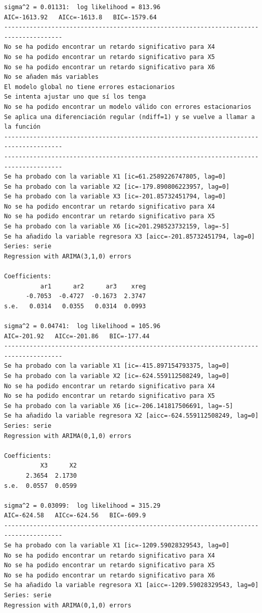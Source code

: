 \documentclass[
  12pt,
  a4paper]{article}
\begin{document}
\begin{verbatim}
sigma^2 = 0.01131:  log likelihood = 813.96
AIC=-1613.92   AICc=-1613.8   BIC=-1579.64
--------------------------------------------------------------------------------------
No se ha podido encontrar un retardo significativo para X4
No se ha podido encontrar un retardo significativo para X5
No se ha podido encontrar un retardo significativo para X6
No se añaden más variables
El modelo global no tiene errores estacionarios
Se intenta ajustar uno que sí los tenga
No se ha podido encontrar un modelo válido con errores estacionarios
Se aplica una diferenciación regular (ndiff=1) y se vuelve a llamar a la función
--------------------------------------------------------------------------------------
--------------------------------------------------------------------------------------
Se ha probado con la variable X1 [ic=61.2589226747805, lag=0]
Se ha probado con la variable X2 [ic=-179.890806223957, lag=0]
Se ha probado con la variable X3 [ic=-201.85732451794, lag=0]
No se ha podido encontrar un retardo significativo para X4
No se ha podido encontrar un retardo significativo para X5
Se ha probado con la variable X6 [ic=201.298523732159, lag=-5]
Se ha añadido la variable regresora X3 [aicc=-201.85732451794, lag=0]
Series: serie 
Regression with ARIMA(3,1,0) errors 

Coefficients:
          ar1      ar2      ar3    xreg
      -0.7053  -0.4727  -0.1673  2.3747
s.e.   0.0314   0.0355   0.0314  0.0993

sigma^2 = 0.04741:  log likelihood = 105.96
AIC=-201.92   AICc=-201.86   BIC=-177.44
--------------------------------------------------------------------------------------
Se ha probado con la variable X1 [ic=-415.897154793375, lag=0]
Se ha probado con la variable X2 [ic=-624.559112508249, lag=0]
No se ha podido encontrar un retardo significativo para X4
No se ha podido encontrar un retardo significativo para X5
Se ha probado con la variable X6 [ic=-206.141817506691, lag=-5]
Se ha añadido la variable regresora X2 [aicc=-624.559112508249, lag=0]
Series: serie 
Regression with ARIMA(0,1,0) errors 

Coefficients:
          X3      X2
      2.3654  2.1730
s.e.  0.0557  0.0599

sigma^2 = 0.03099:  log likelihood = 315.29
AIC=-624.58   AICc=-624.56   BIC=-609.9
--------------------------------------------------------------------------------------
Se ha probado con la variable X1 [ic=-1209.59028329543, lag=0]
No se ha podido encontrar un retardo significativo para X4
No se ha podido encontrar un retardo significativo para X5
No se ha podido encontrar un retardo significativo para X6
Se ha añadido la variable regresora X1 [aicc=-1209.59028329543, lag=0]
Series: serie 
Regression with ARIMA(0,1,0) errors 


\end{verbatim}
\end{document}
